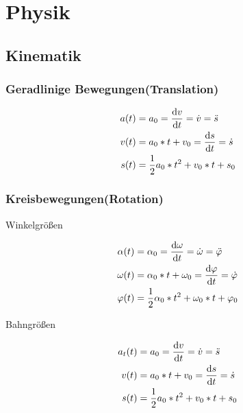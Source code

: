 \chapter{Physik}
\section{Kinematik}
\subsection{Geradlinige Bewegungen(Translation)}

\begin{shaded}
\begin{align}
	a(t)&=a_0=\frac{\mathop{}\!\mathrm{d} v}{\mathop{}\!\mathrm{d} t}=\dot{v}=\ddot{s} \\
	v(t)&=a_0*t+v_0=\frac{\mathop{}\!\mathrm{d} s}{\mathop{}\!\mathrm{d} t}=\dot{s} \\
	s(t)&=\frac{1}{2}a_0*t^2+v_0*t+s_0
\end{align}
\end{shaded}

\subsection{Kreisbewegungen(Rotation)}

\begin{boxleft}
Winkelgrößen
\end{boxleft}\begin{boxrightshaded}
\begin{align}
\alpha(t)&=\alpha_0=\frac{\mathop{}\!\mathrm{d} \omega}{\mathop{}\!\mathrm{d} t}=\dot{\omega}=\ddot{\varphi} \\
\omega(t)&=\alpha_0*t+\omega_0=\frac{\mathop{}\!\mathrm{d} \varphi}{\mathop{}\!\mathrm{d} t}=\dot{\varphi} \\
\varphi(t)&=\frac{1}{2}\alpha_0*t^2+\omega_0*t+\varphi_0
\end{align}
\end{boxrightshaded}

\begin{boxleft}
Bahngrößen
\end{boxleft}\begin{boxrightshaded}
\begin{align}
a_t(t)&=a_0=\frac{\mathop{}\!\mathrm{d} v}{\mathop{}\!\mathrm{d} t}=\dot{v}=\ddot{s} \\
v(t)&=a_0*t+v_0=\frac{\mathop{}\!\mathrm{d} s}{\mathop{}\!\mathrm{d} t}=\dot{s} \\
s(t)&=\frac{1}{2}a_0*t^2+v_0*t+s_0
\end{align}
\end{boxrightshaded}

